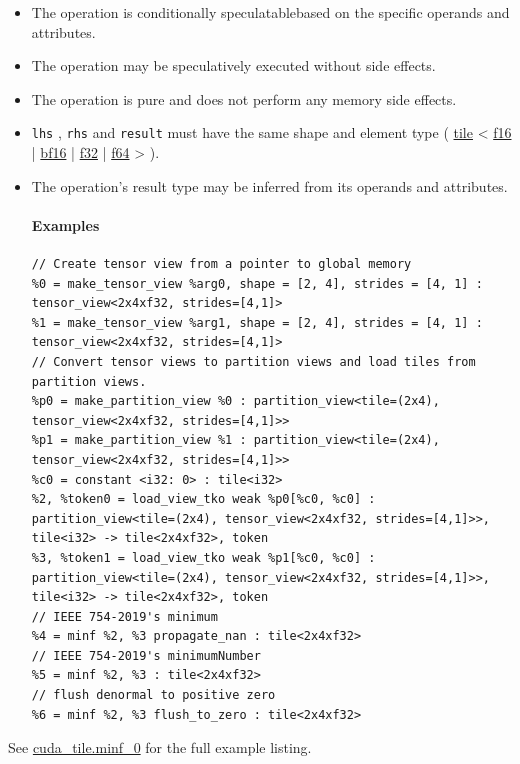 \documentclass{article}
\begin{document}
\begin{itemize}
\item The operation is conditionally speculatablebased on the specific operands and attributes.
\item The operation may be speculatively executed without side effects.
\item The operation is pure and does not perform any memory side effects.
\item \texttt{lhs} , \texttt{rhs} and \texttt{result} must have the same shape and element type ( \href{https://docs.nvidia.com/cuda/tile-ir/latest/sections/types.html#type-tile}{tile} < \href{https://docs.nvidia.com/cuda/tile-ir/latest/sections/types.html#subsection-element-types}{f16} | \href{https://docs.nvidia.com/cuda/tile-ir/latest/sections/types.html#subsection-element-types}{bf16} | \href{https://docs.nvidia.com/cuda/tile-ir/latest/sections/types.html#subsection-element-types}{f32} | \href{https://docs.nvidia.com/cuda/tile-ir/latest/sections/types.html#subsection-element-types}{f64} > ).
\item The operation's result type may be inferred from its operands and attributes.


\paragraph{Examples}

\begin{lstlisting}
// Create tensor view from a pointer to global memory
%0 = make_tensor_view %arg0, shape = [2, 4], strides = [4, 1] : tensor_view<2x4xf32, strides=[4,1]>
%1 = make_tensor_view %arg1, shape = [2, 4], strides = [4, 1] : tensor_view<2x4xf32, strides=[4,1]>
// Convert tensor views to partition views and load tiles from partition views.
%p0 = make_partition_view %0 : partition_view<tile=(2x4), tensor_view<2x4xf32, strides=[4,1]>>
%p1 = make_partition_view %1 : partition_view<tile=(2x4), tensor_view<2x4xf32, strides=[4,1]>>
%c0 = constant <i32: 0> : tile<i32>
%2, %token0 = load_view_tko weak %p0[%c0, %c0] : partition_view<tile=(2x4), tensor_view<2x4xf32, strides=[4,1]>>, tile<i32> -> tile<2x4xf32>, token
%3, %token1 = load_view_tko weak %p1[%c0, %c0] : partition_view<tile=(2x4), tensor_view<2x4xf32, strides=[4,1]>>, tile<i32> -> tile<2x4xf32>, token
// IEEE 754-2019's minimum
%4 = minf %2, %3 propagate_nan : tile<2x4xf32>
// IEEE 754-2019's minimumNumber
%5 = minf %2, %3 : tile<2x4xf32>
// flush denormal to positive zero
%6 = minf %2, %3 flush_to_zero : tile<2x4xf32>
\end{lstlisting}

\end{itemize}
See \href{https://docs.nvidia.com/cuda/tile-ir/latest/sections/appendix.html#example-cuda-tile-minf-0}{cuda\_tile.minf\_0} for the full example listing.
\end{document}
